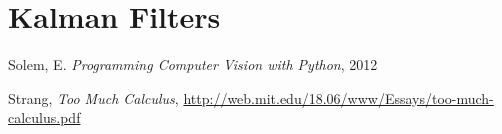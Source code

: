 \documentclass{article}
\begin{document}
\section{Kalman Filters}


  

\begin{thebibliography}{1}

Solem, E. \emph{Programming Computer Vision with Python}, 2012

Strang, \emph{Too Much Calculus}, \url{http://web.mit.edu/18.06/www/Essays/too-much-calculus.pdf}

\end{thebibliography}
\end{document}
